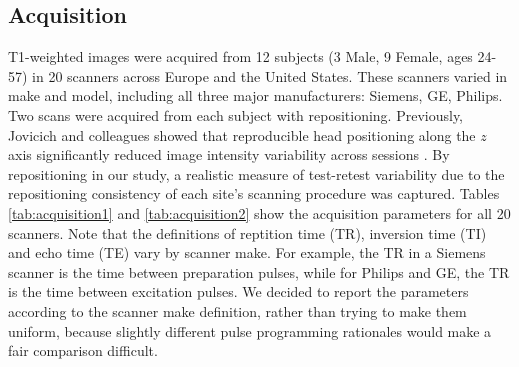 \subsection{Acquisition}
T1-weighted images were acquired from 12 subjects (3 Male, 9 Female, ages 24-57) in 20 scanners across Europe and the United States. These scanners varied in make and model, including all three major manufacturers: Siemens, GE, Philips. Two scans were acquired from each subject with repositioning. Previously, Jovicich and colleagues showed that reproducible head positioning along the $z$ axis significantly reduced image intensity variability across sessions \cite{freesurferReliability}. By repositioning in our study, a realistic measure of test-retest variability due to the repositioning consistency of each site's scanning procedure was captured. Tables \ref{tab:acquisition1} and \ref{tab:acquisition2} show the acquisition parameters for all 20 scanners. Note that the definitions of reptition time (TR), inversion time (TI) and echo time (TE) vary by scanner make. For example, the TR in a Siemens scanner is the time between preparation pulses, while for Philips and GE, the TR is the time between excitation pulses. We decided to report the parameters according to the scanner make definition, rather than trying to make them uniform, because slightly different pulse programming rationales would make a fair comparison difficult.